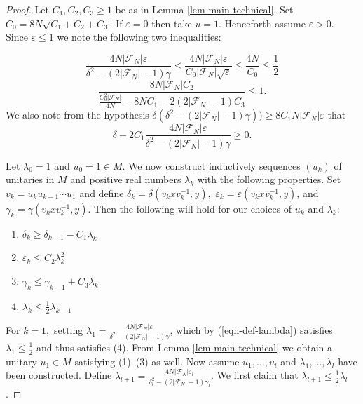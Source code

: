 \documentclass[10pt,a4paper]{amsart}
\newcommand{\cF}{\mathcal{F}}
\newcommand{\ee}{\varepsilon}
\begin{document}
\begin{proof}
    Let $C_1,C_2,C_3\ge1$ be as in Lemma \ref{lem-main-technical}. Set $C_0 = 8N\sqrt{C_1+C_2+C_3}$. If $\ee=0$ then take $u=1$. Henceforth assume $\ee > 0$. Since $\ee \le 1$ we note the following two inequalities:

    \begin{equation}\label{eqn-def-lambda}
        \frac{4N|\cF_N|\ee}{\delta^2 - (2|\cF_N|-1)\gamma} < \frac{4N|\cF_N|\ee}{C_0|\cF_N|\sqrt{\ee}} \le \frac{4N}{C_0} \le \frac{1}{2}
    \end{equation}
    \begin{equation}\label{eqn-def-C0}
        \frac{8N|\cF_N|C_2}{\frac{C_0^2|\cF_N|}{4N} - 8NC_1 - 2(2|\cF_N|-1)C_3} \le 1.
    \end{equation}
    We also note from the hypothesis $\delta(\delta^2-(2|\cF_N|-1)\gamma)) \ge 8C_1N|\cF_N|\ee$ that
    \begin{equation}\label{eqn-pos-delta}
        \delta - 2C_1\frac{4N|\cF_N|\ee}{\delta^2 - (2|\cF_N|-1)\gamma} \ge 0.
    \end{equation}

    Let $\lambda_0 = 1$ and $u_0 = 1\in M$. We now construct inductively sequences $(u_k)$ of unitaries in $M$ and positive real numbers $\lambda_k$ with the following properties. Set $v_k = u_ku_{k-1}\cdots u_1$ and define $\delta_k = \delta(v_kxv_k^{-1},y),$ $\ee_k = \ee(v_kxv_k^{-1},y)$, and $\gamma_k = \gamma(v_kxv_k^{-1},y)$. Then the following will hold for our choices of $u_k$ and $\lambda_k$:
    \begin{enumerate}
        \item $\delta_k \ge \delta_{k-1} - C_1\lambda_k$
        \item $\ee_k \le C_2\lambda_k^2$
        \item $\gamma_k \le \gamma_{k-1} + C_3\lambda_k$
        \item $\lambda_k\le \frac{1}{2}\lambda_{k-1}$
    \end{enumerate}

    For $k=1,$ setting $\lambda_1 =  \frac{4N|\cF_N|\ee}{\delta^2 - (2|\cF_N|-1)\gamma}$, which by (\ref{eqn-def-lambda}) satisfies $\lambda_1\le \frac12$ and thus satisfies (4). From Lemma \ref{lem-main-technical} we obtain a unitary $u_1\in M$ satisfying (1)--(3) as well. Now assume $u_1,\ldots, u_l$ and $\lambda_1,\ldots,\lambda_l$ have been constructed. Define $\lambda_{l+1} = \frac{4N|\cF_N|\ee_l}{\delta_l^2 - (2|\cF_N|-1)\gamma_l}$. We first claim that $\lambda_{l+1} \le \frac{1}{2}\lambda_l$. 


\end{proof}
\end{document}
